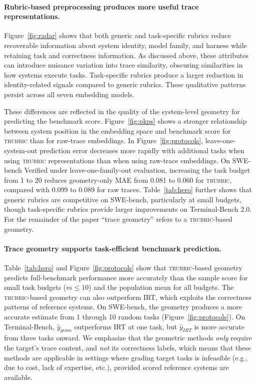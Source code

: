 \documentclass{article}
\newcommand{\trubric}{\textsc{trubric}}
\begin{document}
\paragraph{Rubric-based preprocessing produces more useful trace representations.}
Figure~\ref{fig:radar} shows that both generic and task-specific rubrics reduce recoverable information about system identity, model family, and harness while retaining task and correctness information.
As discussed above, these attributes can introduce nuisance variation into trace similarity, obscuring similarities in how systems execute tasks.
Task-specific rubrics produce a larger reduction in identity-related signals compared to generic rubrics.
These qualitative patterns persist across all seven embedding models.

These differences are reflected in the quality of the system-level geometry for predicting the benchmark score.
Figure~\ref{fig:pkps} shows a stronger relationship between system position in the embedding space and benchmark score for \trubric{} than for raw-trace embeddings.
In Figure~\ref{fig:protocols}, leave-one-system-out prediction error decreases more rapidly with additional tasks when using \trubric{} representations than when using raw-trace embeddings.
On SWE-bench Verified under leave-one-family-out evaluation, increasing the task budget from 1 to 20 reduces geometry-only MAE from 0.081 to 0.060 for \trubric{}, compared with 0.099 to 0.089 for raw traces.
Table~\ref{tab:hero} further shows that generic rubrics are competitive on SWE-bench, particularly at small budgets, though task-specific rubrics provide larger improvements on Terminal-Bench 2.0.
For the remainder of the paper ``trace geometry'' refers to a \trubric{}-based geometry.

\paragraph{Trace geometry supports task-efficient benchmark prediction.}
Table~\ref{tab:hero} and Figure~\ref{fig:protocols} show that \trubric{}-based geometry predicts full-benchmark performance more accurately than the sample score for small task budgets ($ m \le 10 $) and the population mean for all budgets.
The \trubric{}-based geometry can also outperform IRT, which exploits the correctness patterns of reference systems.
On SWE-bench, the geometry produces a more accurate estimate from 1 through 10 random tasks (Figure~\ref{fig:protocols}).
On Terminal-Bench, $\hat{y}_{geom} $ outperforms IRT at one task, but $ \hat{y}_{IRT} $ is more accurate from three tasks onward.
We emphasize that the geometric methods \emph{only} require the target's trace content, and \emph{not} its correctness labels, which means that these methods are applicable in settings where grading target tasks is infeasible (e.g., due to cost, lack of expertise, etc.), provided scored reference systems are available.
\end{document}
